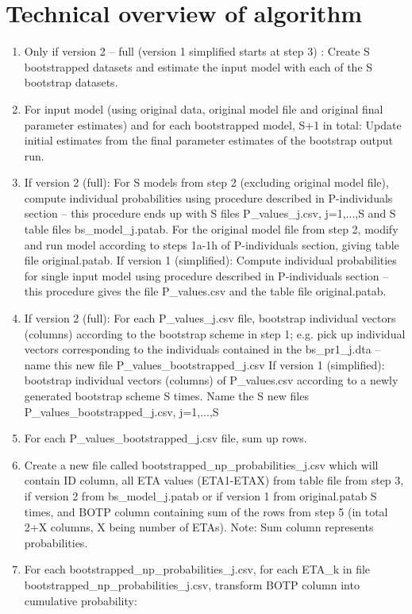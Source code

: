 \section{Technical overview of algorithm}

\begin{enumerate}
\item Only if version 2 – full (version 1 simplified starts at step 3) : Create S bootstrapped datasets and estimate the input model with each of the S bootstrap datasets. 
\item For input model (using original data, original model file and original final parameter estimates) and for each bootstrapped model, S+1 in total: Update initial estimates from the final parameter estimates of the bootstrap output run. 
\item If version 2 (full): For S models from step 2 (excluding original model file), compute individual probabilities using procedure described in P-individuals section – this procedure ends up with S files P\_values\_j.csv, j=1,...,S and S table files bs\_model\_j.patab. For the original model file from step 2, modify and run model according to steps 1a-1h of P-individuals section, giving table file original.patab.
	If version 1 (simplified): Compute individual probabilities for single input model using 	procedure described in P-individuals section – this procedure gives the file P\_values.csv and the 	table file original.patab.
\item If version 2 (full): For each P\_values\_j.csv file, bootstrap individual vectors (columns) according to the bootstrap scheme in step 1; e.g. pick up individual vectors corresponding to the individuals contained in the bs\_pr1\_j.dta – name this new file P\_values\_bootstrapped\_j.csv
	If version 1 (simplified): bootstrap individual vectors (columns) of P\_values.csv according to a 	newly generated bootstrap scheme S times. Name the S new files P\_values\_bootstrapped\_j.csv, 	j=1,...,S
\item For each P\_values\_bootstrapped\_j.csv file, sum up rows.
\item Create a new file called bootstrapped\_np\_probabilities\_j.csv which will contain ID column, all ETA values (ETA1-ETAX) from table file from step 3, if version 2 from bs\_model\_j.patab or if version 1 from original.patab S times, and BOTP column containing sum of the rows from step 5 (in total 2+X columns, X being number of ETAs). Note: Sum column represents probabilities.
\item For each bootstrapped\_np\_probabilities\_j.csv, for each ETA\_k in file bootstrapped\_np\_probabilities\_j.csv, transform BOTP column into cumulative probability:

\end{enumerate}
